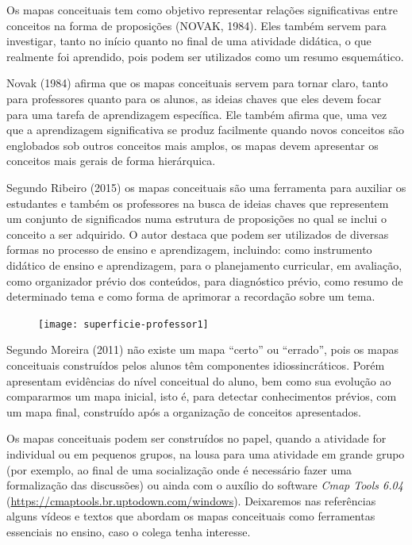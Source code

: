 \begin{apresentacao}
  Os mapas conceituais tem como objetivo representar relações significativas entre conceitos na forma de proposições (NOVAK, 1984).  Eles também servem para investigar, tanto no início quanto no final de uma atividade didática, o que realmente foi aprendido, pois podem ser utilizados como um resumo esquemático.

  Novak (1984) afirma que os mapas conceituais servem para tornar claro, tanto para professores quanto para os alunos, as ideias chaves que eles devem focar para uma tarefa de aprendizagem específica. Ele também afirma que, uma vez que a aprendizagem significativa se produz facilmente quando novos conceitos são englobados sob outros conceitos mais amplos, os mapas devem apresentar os conceitos mais gerais de forma hierárquica.

  Segundo Ribeiro (2015) os mapas conceituais são uma ferramenta para auxiliar os estudantes e também os professores na busca de ideias chaves que representem um conjunto de significados numa estrutura de proposições no qual se inclui o conceito a ser adquirido.  O autor destaca que podem ser utilizados de diversas formas no processo de ensino e aprendizagem, incluindo: como instrumento didático de ensino e aprendizagem, para o planejamento curricular, em avaliação, como organizador prévio dos conteúdos, para diagnóstico prévio, como resumo de determinado tema e como forma de aprimorar a recordação sobre um tema.

  \begin{figure}[H]
  \centering
  
  \texttt{[image: superficie-professor1]}
  \end{figure}
  \columnbreak

  Segundo Moreira (2011) não existe um mapa “certo” ou “errado”, pois os mapas conceituais construídos pelos alunos têm componentes idiossincráticos. Porém apresentam evidências do nível conceitual do aluno, bem como sua evolução ao compararmos um mapa inicial, isto é, para detectar conhecimentos prévios, com um mapa final, construído após a organização de conceitos apresentados.

  Os mapas conceituais podem ser construídos no papel, quando a atividade for individual ou em pequenos grupos, na lousa para uma atividade em grande grupo (por exemplo, ao final de uma socialização onde é necessário fazer uma formalização das discussões) ou ainda com o auxílio do software \textit{Cmap Tools 6.04} (\url{https://cmaptools.br.uptodown.com/windows}). Deixaremos nas referências alguns vídeos e textos que abordam os mapas conceituais como ferramentas essenciais no ensino, caso o colega tenha interesse.


\end{apresentacao}
